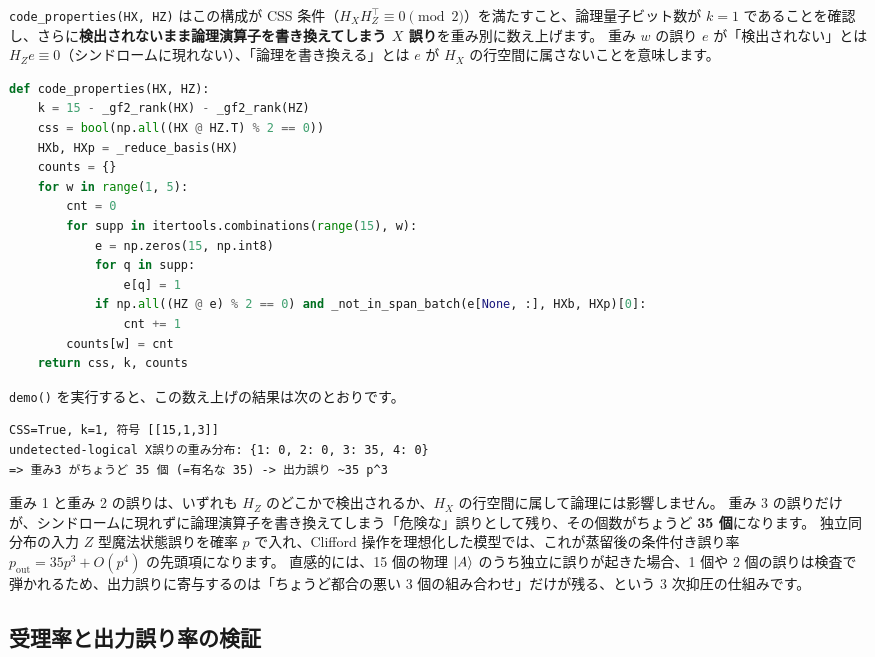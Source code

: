 \texttt{code\_properties(HX, HZ)} はこの構成が CSS 条件（$H_X H_Z^\top \equiv 0 \pmod 2$）を満たすこと、論理量子ビット数が $k=1$ であることを確認し、さらに\textbf{検出されないまま論理演算子を書き換えてしまう $X$ 誤り}を重み別に数え上げます。
重み $w$ の誤り $e$ が「検出されない」とは $H_Z e \equiv 0$（シンドロームに現れない）、「論理を書き換える」とは $e$ が $H_X$ の行空間に属さないことを意味します。

\begin{lstlisting}[language=Python, caption={undetected-logical 誤りの数え上げ（src/stages/01\_mpp/src/ftqc/t\_gate.py）}]
def code_properties(HX, HZ):
    k = 15 - _gf2_rank(HX) - _gf2_rank(HZ)
    css = bool(np.all((HX @ HZ.T) % 2 == 0))
    HXb, HXp = _reduce_basis(HX)
    counts = {}
    for w in range(1, 5):
        cnt = 0
        for supp in itertools.combinations(range(15), w):
            e = np.zeros(15, np.int8)
            for q in supp:
                e[q] = 1
            if np.all((HZ @ e) % 2 == 0) and _not_in_span_batch(e[None, :], HXb, HXp)[0]:
                cnt += 1
        counts[w] = cnt
    return css, k, counts
\end{lstlisting}

\texttt{demo()} を実行すると、この数え上げの結果は次のとおりです。

\begin{lstlisting}[caption={t\_gate.py 実行結果（抜粋）}]
CSS=True, k=1, 符号 [[15,1,3]]
undetected-logical X誤りの重み分布: {1: 0, 2: 0, 3: 35, 4: 0}
=> 重み3 がちょうど 35 個 (=有名な 35) -> 出力誤り ~35 p^3
\end{lstlisting}

重み 1 と重み 2 の誤りは、いずれも $H_Z$ のどこかで検出されるか、$H_X$ の行空間に属して論理には影響しません。
重み 3 の誤りだけが、シンドロームに現れずに論理演算子を書き換えてしまう「危険な」誤りとして残り、その個数がちょうど \textbf{35 個}になります。
独立同分布の入力 $Z$ 型魔法状態誤りを確率 $p$ で入れ、Clifford 操作を理想化した模型では、これが蒸留後の条件付き誤り率 $p_{\mathrm{out}}=35p^3+O(p^4)$ の先頭項になります\cite{bravyi2005magic}。
直感的には、15 個の物理 $\ket{A}$ のうち独立に誤りが起きた場合、1 個や 2 個の誤りは検査で弾かれるため、出力誤りに寄与するのは「ちょうど都合の悪い 3 個の組み合わせ」だけが残る、という 3 次抑圧の仕組みです。

\subsection{受理率と出力誤り率の検証}

